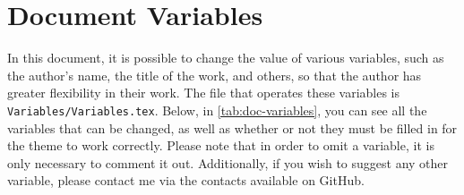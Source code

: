 \chapter{Document Variables}
\label{cp:variables}

In this document, it is possible to change the value of various variables, such as the author's name, the title of the work, and others, so that the author has greater flexibility in their work. The file that operates these variables is \verb|Variables/Variables.tex|. Below, in \autoref{tab:doc-variables}, you can see all the variables that can be changed, as well as whether or not they must be filled in for the theme to work correctly. Please note that in order to omit a variable, it is only necessary to comment it out. Additionally, if you wish to suggest any other variable, please contact me via the contacts available on GitHub.

